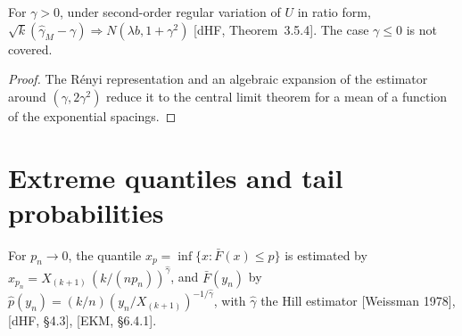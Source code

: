 \begin{theorem}
  \label{thm:moment-normality}
  \leanok
  For $\gamma > 0$, under second-order regular variation of $U$ in ratio form,
  $\sqrt{k}(\hat\gamma_M - \gamma) \Rightarrow N(\lambda b, 1 + \gamma^2)$ [dHF, Theorem~3.5.4]. The case
  $\gamma \le 0$ is not covered.
\end{theorem}
\begin{proof}
  \leanok
  The R\'enyi representation and an algebraic expansion of the estimator around $(\gamma, 2\gamma^2)$ reduce it
  to the central limit theorem for a mean of a function of the exponential spacings.
\end{proof}

\section{Extreme quantiles and tail probabilities}

\begin{definition}
  \label{def:weissman}
  \leanok
  For $p_n \to 0$, the quantile $x_{p} = \inf\{x : \bar F(x) \le p\}$ is estimated by
  $\hat x_{p_n} = X_{(k+1)} \, (k/(n p_n))^{\hat\gamma}$, and $\bar F(y_n)$ by
  $\hat p(y_n) = (k/n)(y_n / X_{(k+1)})^{-1/\hat\gamma}$, with $\hat\gamma$ the Hill estimator
  [Weissman 1978], [dHF, \S4.3], [EKM, \S6.4.1].
\end{definition}

